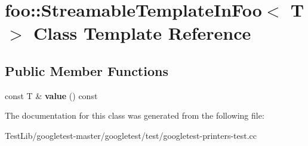 \hypertarget{classfoo_1_1StreamableTemplateInFoo}{}\section{foo\+:\+:Streamable\+Template\+In\+Foo$<$ T $>$ Class Template Reference}
\label{classfoo_1_1StreamableTemplateInFoo}
\subsection*{Public Member Functions}
\begin{DoxyCompactItemize}
\item 
\mbox{\label{classfoo_1_1StreamableTemplateInFoo_aa6e29a9a298014ce74c65423b6985023}} 
const T \& {\bfseries value} () const
\end{DoxyCompactItemize}


The documentation for this class was generated from the following file\+:\begin{DoxyCompactItemize}
\item 
Test\+Lib/googletest-\/master/googletest/test/googletest-\/printers-\/test.\+cc\end{DoxyCompactItemize}
